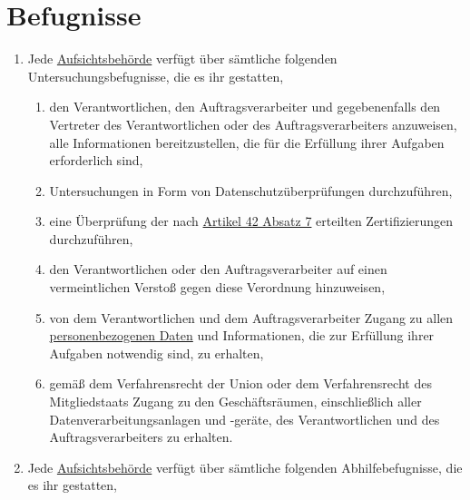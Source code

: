 \chapter{Befugnisse}
\label{ch:58}


\begin{enumerate}

  \item Jede \hyperref[itm:04-21]{Aufsichtsbehörde} verfügt über sämtliche folgenden Untersuchungsbefugnisse, die es ihr gestatten,
  \label{itm:58-1}

  \begin{enumerate}
  
    \item den Verantwortlichen, den Auftragsverarbeiter und gegebenenfalls den Vertreter des Verantwortlichen oder des
     Auftragsverarbeiters anzuweisen, alle Informationen bereitzustellen, die für die Erfüllung ihrer Aufgaben
     erforderlich sind,
    \label{itm:58-1a}

    \item Untersuchungen in Form von Datenschutzüberprüfungen durchzuführen,
    \label{itm:581b}

    \item eine Überprüfung der nach \hyperref[itm:42-7]{Artikel 42 Absatz 7} erteilten Zertifizierungen durchzuführen,
    \label{itm:58-1c}

    \item den Verantwortlichen oder den Auftragsverarbeiter auf einen vermeintlichen Verstoß gegen diese Verordnung
     hinzuweisen,
    \label{itm:58-1d}

    \item von dem Verantwortlichen und dem Auftragsverarbeiter Zugang zu allen \hyperref[itm:04-1]{personenbezogenen Daten} und
     Informationen, die zur Erfüllung ihrer Aufgaben notwendig sind, zu erhalten,
    \label{itm:58-1e}

    \item gemäß dem Verfahrensrecht der Union oder dem Verfahrensrecht des Mitgliedstaats Zugang zu den Geschäftsräumen,
     einschließlich aller Datenverarbeitungsanlagen und -geräte, des Verantwortlichen und des Auftragsverarbeiters zu
     erhalten.
    \label{itm:58-1f}

  \end{enumerate}

  \item Jede \hyperref[itm:04-21]{Aufsichtsbehörde} verfügt über sämtliche folgenden Abhilfebefugnisse, die es ihr gestatten,
  \label{itm:58-2}


\end{enumerate}
